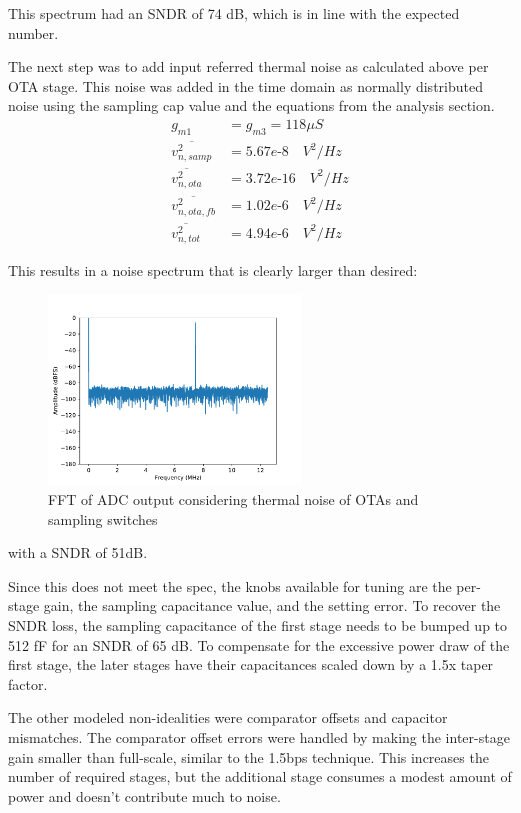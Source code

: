 \documentclass[11pt]{article}
\begin{document}
This spectrum had an SNDR of 74 dB, which is in line with the expected number.

The next step was to add input referred thermal noise as calculated above per OTA stage.
This noise was added in the time domain as normally distributed noise using the sampling cap value and the equations from the analysis section.
\begin{align*}
  g_{m1} &= g_{m3} = 118 \mu S \\
  \overline{v^2_{n,samp}} &= 5.67e\text{-8} \quad V^2/Hz \\
  \overline{v^2_{n,ota}} &= 3.72e\text{-16} \quad V^2/Hz \\
  \overline{v^2_{n,ota,fb}} &= 1.02e\text{-6} \quad V^2/Hz \\
  \overline{v^2_{n,tot}} &= 4.94e\text{-6} \quad V^2/Hz
\end{align*}

This results in a noise spectrum that is clearly larger than desired:
\begin{figure}[h]
  \centering
  \includegraphics[width=0.6\textwidth]{figs/spectrum_much_noise.pdf}
  \caption{FFT of ADC output considering thermal noise of OTAs and sampling switches}
\end{figure}
with a SNDR of 51dB.

Since this does not meet the spec, the knobs available for tuning are the per-stage gain, the sampling capacitance value, and the setting error.
To recover the SNDR loss, the sampling capacitance of the first stage needs to be bumped up to 512 fF for an SNDR of 65 dB.
To compensate for the excessive power draw of the first stage, the later stages have their capacitances scaled down by a 1.5x taper factor.

The other modeled non-idealities were comparator offsets and capacitor mismatches.
The comparator offset errors were handled by making the inter-stage gain smaller than full-scale, similar to the 1.5bps technique.
This increases the number of required stages, but the additional stage consumes a modest amount of power and doesn't contribute much to noise.
\end{document}
